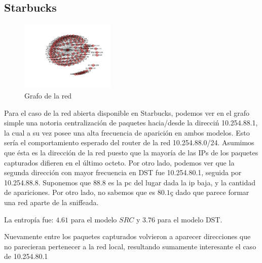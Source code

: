 \subsection{Starbucks}

\begin{figure}
\vspace{-35pt}
\hspace{-35pt}
\centering
   \includegraphics[width=0.4\textwidth]{resultados/starbucks/conectividadNX.pdf}
\vspace{-30pt}
   \caption{Grafo de la red}
\end{figure}


Para el caso de la red abierta disponible en Starbucks, podemos ver en el 
grafo simple una notoria centralizaci\'on de paquetes hacia/desde la direcci\'n
10.254.88.1, la cual a su vez posee una alta frecuencia de aparici\'on en ambos
modelos. Esto ser\'ia el comportamiento esperado del router de la red
10.254.88.0/24. Asumimos que \'esta es la direcci\'on de la red puesto que 
la mayor\'ia de las IPs de los paquetes capturados difieren en el \'ultimo octeto.
Por otro lado, podemos ver que la segunda direcci\'on con mayor frecuencia en DST
fue 10.254.80.1, seguida por 10.254.88.8. Suponemos que $88.8$ es la pc del lugar
dada la ip baja, y la cantidad de apariciones. Por otro lado, no sabemos que es
$80.1ç$ dado que parece formar una red aparte de la sniffeada.

La entrop\'ia fue: $4.61$ para el modelo $SRC$ y $3.76$ para el modelo
DST.


Nuevamente entre los paquetes capturados volvieron a aparecer direcciones que
no parecieran pertenecer a la red local, resultando sumamente interesante el caso
de 10.254.80.1

